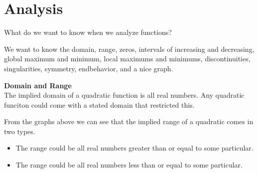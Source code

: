 \documentclass{ximera}
\begin{document}
\begin{image}
\end{image}


\section{Analysis}

What do we want to know when we analyze functions?

We want to know the domain, range, zeros, intervals of increasing and decreasing, global maximum and minimum, local maximums and minimums, discontinuities, singularities, symmetry, endbehavior, and a nice graph.



\textbf{Domain and Range} \\

The implied domain of a quadratic function is all real numbers.  Any quadratic funciton could come with a stated domain that restricted this.

From the graphs above we can see that the implied range of a quadratic comes in two types.  

\begin{itemize}
\item The range could be all real numbers greater than or equal to some particular.
\item The range could be all real numbers less than or equal to some particular.
\end{itemize}
\end{document}
